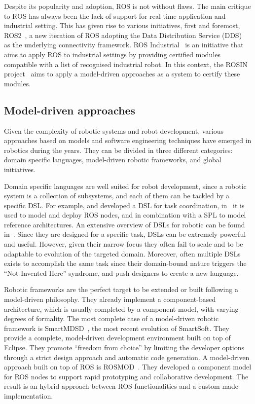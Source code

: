 Despite its popularity and adoption, ROS is not without flaws. The main critique to ROS has always been the lack of support for real-time application and industrial setting. This has given rise to various initiatives, first and foremost, ROS2~\cite{ros2}, a new iteration of ROS adopting the Data Distribution Service (DDS)~\cite{pardo2003omg} as the underlying connectivity framework. ROS Industrial~\cite{edwards2012ros} is an initiative that aims to apply ROS to industrial settings by providing certified modules compatible with a list of recognised industrial robot. In this context, the ROSIN project~\cite{rosin} aims to apply a model-driven approaches as a system to certify these modules.

\subsection{Model-driven approaches}
Given the complexity of robotic systems and robot development, various approaches based on models and software engineering techniques have emerged in robotics during the years. They can be divided in three different categories: domain specific languages, model-driven robotic frameworks, and global initiatives.

Domain specific languages are well suited for robot development, since a robotic system is a collection of subsystems, and each of them can be tackled by a specific DSL. For example, \cite{steck2011managing} and \cite{klotzbucher2012coordinating} developed a DSL for task coordination, in~\cite{hochgeschwender2013model} it is used to model and deploy ROS nodes, and \cite{gherardi2011eclipse} in combination with a SPL to model reference architectures. An extensive overview of DSLs for robotic can be found in~\cite{nordmann2014survey}. Since they are designed for a specific task, DSLs can be extremely powerful and useful. However, given their narrow focus they often fail to scale and to be adaptable to evolution of the targeted domain. Moreover, often multiple DSLs exists to accomplish the same task since their domain-bound nature triggers the ``Not Invented Here'' syndrome, and push designers to create a new language.

Robotic frameworks are the perfect target to be extended or built following a model-driven philosophy. They already implement a component-based architecture, which is usually completed by a component model, with varying degrees of formality. The most complete case of a model-driven robotic framework is SmartMDSD~\cite{dennis2016smartmdsd}, the most recent evolution of SmartSoft. They provide a complete, model-driven development environment built on top of Eclipse. They promote ``freedom from choice'' by limiting the developer options through a strict design approach and automatic code generation. A model-driven approach built on top of ROS is ROSMOD~\cite{kumar2016rosmod}. They developed a component model for ROS nodes to support rapid prototyping and collaborative development. The result is an hybrid approach between ROS functionalities and a custom-made implementation.

